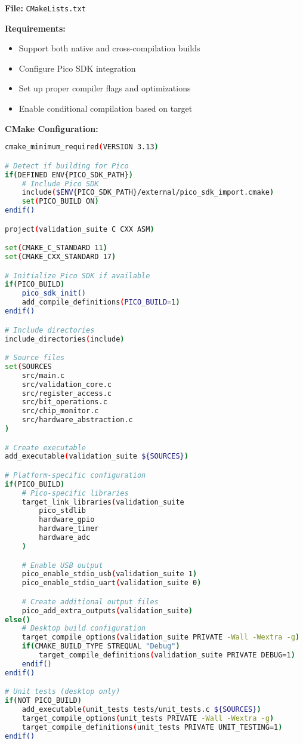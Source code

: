 \documentclass[11pt,a4paper]{article}
\begin{document}
\textbf{File:} \texttt{CMakeLists.txt}

\textbf{Requirements:}
\begin{itemize}
    \item Support both native and cross-compilation builds
    \item Configure Pico SDK integration
    \item Set up proper compiler flags and optimizations
    \item Enable conditional compilation based on target
\end{itemize}

\textbf{CMake Configuration:}
\begin{lstlisting}[language=bash]
cmake_minimum_required(VERSION 3.13)

# Detect if building for Pico
if(DEFINED ENV{PICO_SDK_PATH})
    # Include Pico SDK
    include($ENV{PICO_SDK_PATH}/external/pico_sdk_import.cmake)
    set(PICO_BUILD ON)
endif()

project(validation_suite C CXX ASM)

set(CMAKE_C_STANDARD 11)
set(CMAKE_CXX_STANDARD 17)

# Initialize Pico SDK if available
if(PICO_BUILD)
    pico_sdk_init()
    add_compile_definitions(PICO_BUILD=1)
endif()

# Include directories
include_directories(include)

# Source files
set(SOURCES
    src/main.c
    src/validation_core.c
    src/register_access.c
    src/bit_operations.c
    src/chip_monitor.c
    src/hardware_abstraction.c
)

# Create executable
add_executable(validation_suite ${SOURCES})

# Platform-specific configuration
if(PICO_BUILD)
    # Pico-specific libraries
    target_link_libraries(validation_suite
        pico_stdlib
        hardware_gpio
        hardware_timer
        hardware_adc
    )

    # Enable USB output
    pico_enable_stdio_usb(validation_suite 1)
    pico_enable_stdio_uart(validation_suite 0)

    # Create additional output files
    pico_add_extra_outputs(validation_suite)
else()
    # Desktop build configuration
    target_compile_options(validation_suite PRIVATE -Wall -Wextra -g)
    if(CMAKE_BUILD_TYPE STREQUAL "Debug")
        target_compile_definitions(validation_suite PRIVATE DEBUG=1)
    endif()
endif()

# Unit tests (desktop only)
if(NOT PICO_BUILD)
    add_executable(unit_tests tests/unit_tests.c ${SOURCES})
    target_compile_options(unit_tests PRIVATE -Wall -Wextra -g)
    target_compile_definitions(unit_tests PRIVATE UNIT_TESTING=1)
endif()
\end{lstlisting}
\end{document}
